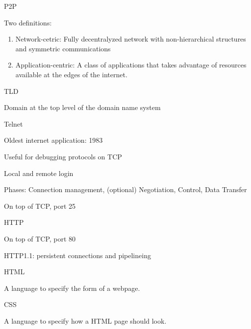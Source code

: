 \documentclass[main.tex]{subfiles}
\begin{document}
\small


\begin{card}{P2P}
\item Two definitions:
    \begin{enumerate}
        \item Network-cetric: Fully decentralyzed network with non-hierarchical structures and symmetric communications
        \item Application-centric: A class of applications that takes advantage of resources available at the edges of the internet.
    \end{enumerate}
\end{card}

\begin{card}{TLD}
\item Domain at the top level of the domain name system
\end{card}

\begin{card}{Telnet}
\item Oldest internet application: 1983
\item Useful for debugging protocols on TCP
\item Local and remote login
\item Phases: Connection management, (optional) Negotiation, Control, Data Transfer
\item On top of TCP, port 25
\end{card}

\begin{card}{HTTP}
\item On top of TCP, port 80
\item HTTP1.1: persistent connections and pipelineing
\end{card}
 
\begin{card}{HTML}
\item A language to specify the form of a webpage.
\end{card}

\begin{card}{CSS}
\item A language to specify how a HTML page should look.
\end{card}

\end{document}
